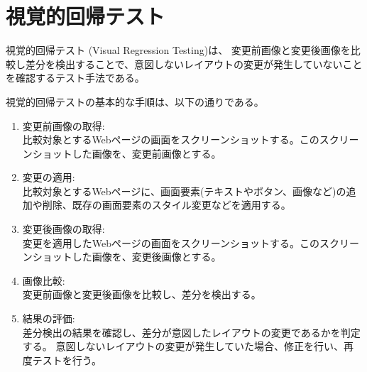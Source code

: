 \section{視覚的回帰テスト}\label{sec:vrt}
視覚的回帰テスト (Visual Regression Testing)\cite{VisualRegressionTesting}は、
変更前画像と変更後画像を比較し差分を検出することで、意図しないレイアウトの変更が発生していないことを確認するテスト手法である。\\
\par
視覚的回帰テストの基本的な手順は、以下の通りである。
\begin{enumerate}
      \setlength{\itemsep}{0pt}
            \setlength{\parsep}{0pt}
      \item 変更前画像の取得:\\
            比較対象とするWebページの画面をスクリーンショットする。このスクリーンショットした画像を、変更前画像とする。
      \item 変更の適用:\\
            比較対象とするWebページに、画面要素(テキストやボタン、画像など)の追加や削除、既存の画面要素のスタイル変更などを適用する。
      \item 変更後画像の取得:\\
            変更を適用したWebページの画面をスクリーンショットする。このスクリーンショットした画像を、変更後画像とする。
      \item 画像比較:\\
            変更前画像と変更後画像を比較し、差分を検出する。
      \item 結果の評価:\\
            差分検出の結果を確認し、差分が意図したレイアウトの変更であるかを判定する。
            意図しないレイアウトの変更が発生していた場合、修正を行い、再度テストを行う。
\end{enumerate}

